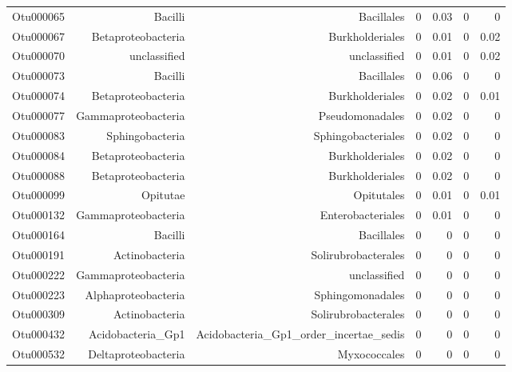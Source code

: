 \begin{table}[ht]
\begin{tabular}{crrrrrr}
  Otu000065 & Bacilli & Bacillales & 0 & 0.03 & 0 & 0 \\ 
  Otu000067 & Betaproteobacteria & Burkholderiales & 0 & 0.01 & 0 & 0.02 \\ 
  Otu000070 & unclassified & unclassified & 0 & 0.01 & 0 & 0.02 \\ 
  Otu000073 & Bacilli & Bacillales & 0 & 0.06 & 0 & 0 \\ 
  Otu000074 & Betaproteobacteria & Burkholderiales & 0 & 0.02 & 0 & 0.01 \\ 
  Otu000077 & Gammaproteobacteria & Pseudomonadales & 0 & 0.02 & 0 & 0 \\ 
  Otu000083 & Sphingobacteria & Sphingobacteriales & 0 & 0.02 & 0 & 0 \\ 
  Otu000084 & Betaproteobacteria & Burkholderiales & 0 & 0.02 & 0 & 0 \\ 
  Otu000088 & Betaproteobacteria & Burkholderiales & 0 & 0.02 & 0 & 0 \\ 
  Otu000099 & Opitutae & Opitutales & 0 & 0.01 & 0 & 0.01 \\ 
  Otu000132 & Gammaproteobacteria & Enterobacteriales & 0 & 0.01 & 0 & 0 \\ 
  Otu000164 & Bacilli & Bacillales & 0 & 0 & 0 & 0 \\ 
  Otu000191 & Actinobacteria & Solirubrobacterales & 0 & 0 & 0 & 0 \\ 
  Otu000222 & Gammaproteobacteria & unclassified & 0 & 0 & 0 & 0 \\ 
  Otu000223 & Alphaproteobacteria & Sphingomonadales & 0 & 0 & 0 & 0 \\ 
  Otu000309 & Actinobacteria & Solirubrobacterales & 0 & 0 & 0 & 0 \\ 
  Otu000432 & Acidobacteria\_Gp1 & Acidobacteria\_Gp1\_order\_incertae\_sedis & 0 & 0 & 0 & 0 \\ 
  Otu000532 & Deltaproteobacteria & Myxococcales & 0 & 0 & 0 & 0 \\ 
   \hline
\end{tabular}
\end{table}
